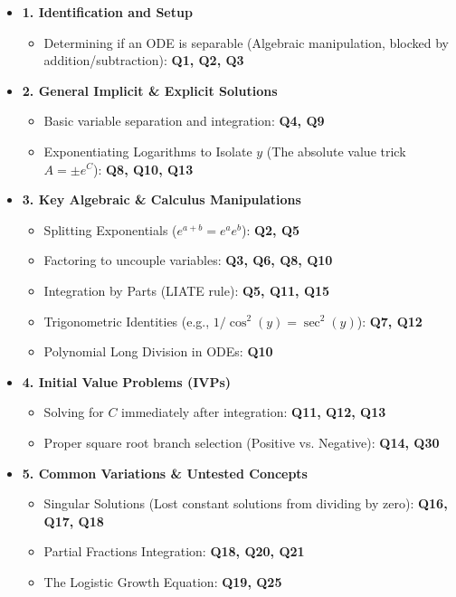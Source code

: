\documentclass[11pt]{article}
\begin{document}
\begin{itemize}
    \item \textbf{1. Identification and Setup}
    \begin{itemize}
        \item Determining if an ODE is separable (Algebraic manipulation, blocked by addition/subtraction): \textbf{Q1, Q2, Q3}
    \end{itemize}
    
    \item \textbf{2. General Implicit \& Explicit Solutions}
    \begin{itemize}
        \item Basic variable separation and integration: \textbf{Q4, Q9}
        \item Exponentiating Logarithms to Isolate $y$ (The absolute value trick $A = \pm e^C$): \textbf{Q8, Q10, Q13}
    \end{itemize}
    
    \item \textbf{3. Key Algebraic \& Calculus Manipulations}
    \begin{itemize}
        \item Splitting Exponentials ($e^{a+b} = e^a e^b$): \textbf{Q2, Q5}
        \item Factoring to uncouple variables: \textbf{Q3, Q6, Q8, Q10}
        \item Integration by Parts (LIATE rule): \textbf{Q5, Q11, Q15}
        \item Trigonometric Identities (e.g., $1/\cos^2(y) = \sec^2(y)$): \textbf{Q7, Q12}
        \item Polynomial Long Division in ODEs: \textbf{Q10}
    \end{itemize}
    
    \item \textbf{4. Initial Value Problems (IVPs)}
    \begin{itemize}
        \item Solving for $C$ immediately after integration: \textbf{Q11, Q12, Q13}
        \item Proper square root branch selection (Positive vs. Negative): \textbf{Q14, Q30}
    \end{itemize}
    
    \item \textbf{5. Common Variations \& Untested Concepts}
    \begin{itemize}
        \item Singular Solutions (Lost constant solutions from dividing by zero): \textbf{Q16, Q17, Q18}
        \item Partial Fractions Integration: \textbf{Q18, Q20, Q21}
        \item The Logistic Growth Equation: \textbf{Q19, Q25}
    \end{itemize}
    

\end{itemize}
\end{document}
